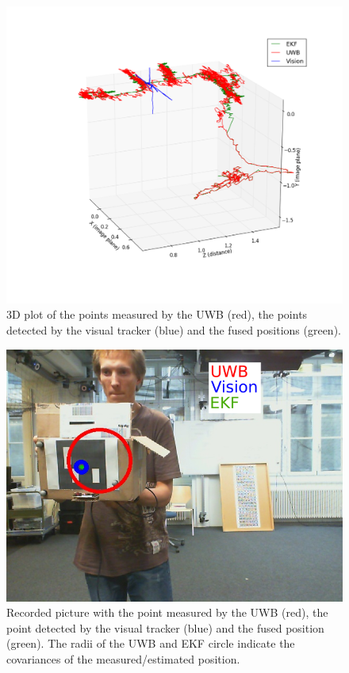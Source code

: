 \begin{figure}[ht!]\centering
	\includegraphics[width=1.0\textwidth]{figures/state_track}
	\caption{3D plot of the points measured by the \ac{UWB} (red), the points detected by the visual tracker (blue) and the fused positions (green).}\label{fig:statetrack}
\end{figure}

\begin{figure}[ht!]\centering
	\includegraphics[width=1.0\textwidth]{figures/2d_output}
	\caption{Recorded picture with the point measured by the \ac{UWB} (red), the point detected by the visual tracker (blue) and the fused position (green). The radii of the \ac{UWB} and \ac{EKF} circle indicate the covariances of the measured/estimated position.}\label{fig:statetrack2d}
\end{figure}